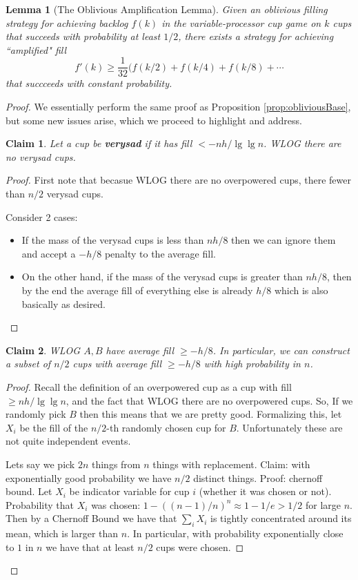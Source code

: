 \documentclass[twocolumn]{article}[11pt]
\newcommand{\defn}[1]{{\textit{\textbf{\boldmath #1}}}}
\newtheorem{clm}{Claim}
\newtheorem{lemma}{Lemma}
\begin{document}
\begin{lemma}[The Oblivious Amplification Lemma]
  Given an oblivious filling strategy for achieving backlog $f(k)$ in the
  variable-processor cup game on $k$ cups that succeeds with probability at
  least $1/2$, there exists a strategy for achieving ``amplified" fill $$f'(k)
  \ge \frac{1}{32}(f(k/2) + f(k/4) + f(k/8) + \cdots $$ that succceeds with constant probability.
\end{lemma}
\begin{proof}
  We essentially perform the same proof as Proposition \ref{prop:obliviousBase}, but some new issues arise, which we proceed to highlight and address. 

\begin{clm}
  Let a cup be \defn{verysad} if it has fill $< -nh/\lg\lg n$.
  WLOG there are no verysad cups. 
\end{clm}
\begin{proof}
  First note that becasue WLOG there are no overpowered cups, there fewer than $n/2$ verysad cups.

  Consider 2 cases:
  \begin{itemize}
    \item If the mass of the verysad cups is less than $nh/8$ then we can
      ignore them and accept a $-h/8$ penalty to the average fill.
    \item On the other hand, if the mass of the verysad cups is greater than
      $nh/8$, then by the end the average fill of everything else is already
      $h/8$ which is also basically as desired.
  \end{itemize}
\end{proof}

\begin{clm}
  WLOG $A,B$ have average fill $\ge -h/8$.
  In particular, we can construct a subset of $n/2$
  cups with average fill $\ge -h/8$ with high probability in $n$. 
\end{clm}
\begin{proof}

  Recall the definition of an overpowered cup as a cup with fill $\ge nh / \lg \lg n$,
  and the fact that WLOG there are no overpowered cups.
  So, If we randomly pick $B$ then this means that we are pretty good. 
  Formalizing this, let $X_i$ be the fill of the $n/2$-th randomly chosen cup
  for $B$. Unfortunately these are not quite independent events.

  Lets say we pick $2n$ things from $n$ things with replacement. Claim: with
  exponentially good probability we have $n/2$ distinct things. 
  Proof: chernoff bound. Let $X_i$ be indicator variable for cup $i$ (whether
  it was chosen or not). Probability that $X_i$ was chosen: $1-((n-1)/n)^n
  \approx 1-1/e > 1/2$ for large $n$. 
  Then by a Chernoff Bound we have that $\sum_i X_i$ is tightly concentrated
  around its mean, which is larger than $n$. In particular, with probability
  exponentially close to $1$ in $n$ we have that at least $n/2$ cups were chosen.


\end{proof}
\end{proof}
\end{document}
